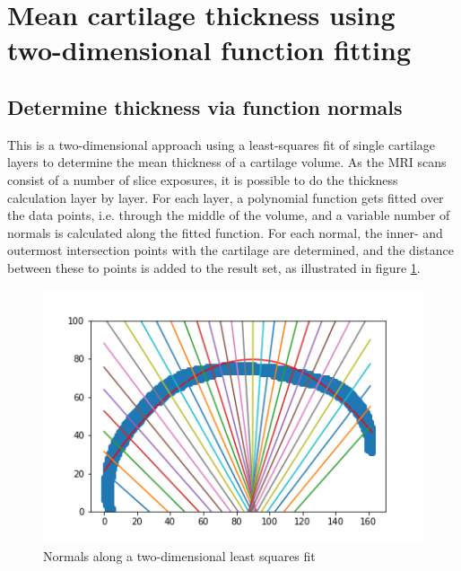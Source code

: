 \section{Mean cartilage thickness using two-dimensional function fitting}
\subsection{Determine thickness via function normals}
This is a two-dimensional approach using a least-squares fit of single cartilage layers to determine the mean thickness of a cartilage volume. As the MRI scans consist of a number of slice exposures, it is possible to do the thickness calculation layer by layer. For each layer, a polynomial function gets fitted over the data points, i.e. through the middle of the volume, and a variable number of normals is calculated along the fitted function. For each normal, the inner- and outermost intersection points with the cartilage are determined, and the distance between these to points is added to the result set, as illustrated in figure \ref{fig:normals}.
\begin{figure}[htb!]
	\centering
	\includegraphics[width=\linewidth]{./figures/normals}
	\caption{Normals along a two-dimensional least squares fit}
	\label{fig:normals}
\end{figure} 

